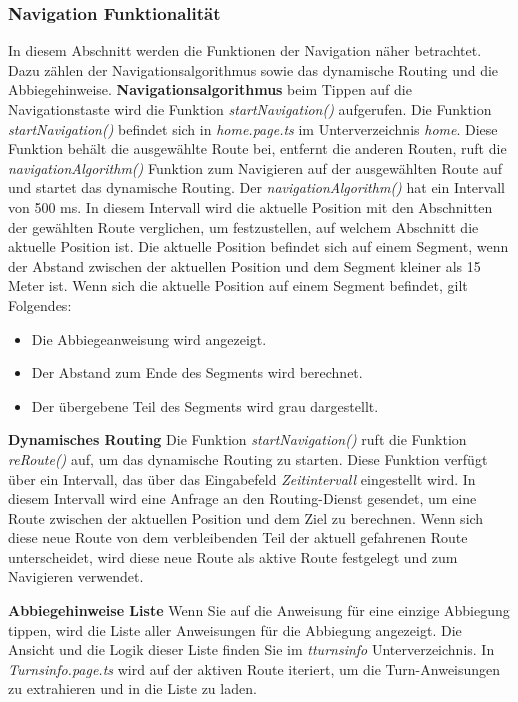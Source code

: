 \subsubsection{Navigation Funktionalität}
\label{sec:navigation:navigationsfunktionaliteaten}
In diesem Abschnitt werden die Funktionen der Navigation näher betrachtet. Dazu zählen der Navigationsalgorithmus sowie das dynamische Routing und die Abbiegehinweise. \newline
\textbf{Navigationsalgorithmus}\newline
beim Tippen auf die Navigationstaste wird die Funktion \textit{startNavigation()} aufgerufen. 
Die Funktion \textit{startNavigation()} befindet sich in \textit{home.page.ts} im Unterverzeichnis \textit{home}. 
Diese Funktion behält die ausgewählte Route bei, entfernt die anderen Routen, ruft die \textit{navigationAlgorithm()} Funktion zum Navigieren auf der ausgewählten Route auf und startet das dynamische Routing. 
Der \textit{navigationAlgorithm()} hat ein Intervall von 500 ms. 
In diesem Intervall wird die aktuelle Position mit den Abschnitten der gewählten Route verglichen, um festzustellen, auf welchem Abschnitt die aktuelle Position ist. 
Die aktuelle Position befindet sich auf einem Segment, wenn der Abstand zwischen der aktuellen Position und dem Segment kleiner als 15 Meter ist. 
Wenn sich die aktuelle Position auf einem Segment befindet, gilt Folgendes:
\begin{itemize}
	\item Die Abbiegeanweisung wird angezeigt.
	\item Der Abstand zum Ende des Segments wird berechnet.
	\item Der übergebene Teil des Segments wird grau dargestellt.
\end{itemize}

\textbf{Dynamisches Routing} \newline
Die Funktion \textit{startNavigation()} ruft die Funktion \textit{reRoute()} auf, um das dynamische Routing zu starten. 
Diese Funktion verfügt über ein Intervall, das über das Eingabefeld \textit{Zeitintervall} eingestellt wird. 
In diesem Intervall wird eine Anfrage an den Routing-Dienst gesendet, um eine Route zwischen der aktuellen Position und dem Ziel zu berechnen. 
Wenn sich diese neue Route von dem verbleibenden Teil der aktuell gefahrenen Route unterscheidet, wird diese neue Route als aktive Route festgelegt und zum Navigieren verwendet.

\textbf{Abbiegehinweise Liste} \newline
Wenn Sie auf die Anweisung für eine einzige Abbiegung tippen, wird die Liste aller Anweisungen für die Abbiegung angezeigt. 
Die Ansicht und die Logik dieser Liste finden Sie im \textit{tturnsinfo} Unterverzeichnis. 
In \textit{Turnsinfo.page.ts} wird auf der aktiven Route iteriert, um die Turn-Anweisungen zu extrahieren und in die Liste zu laden.

